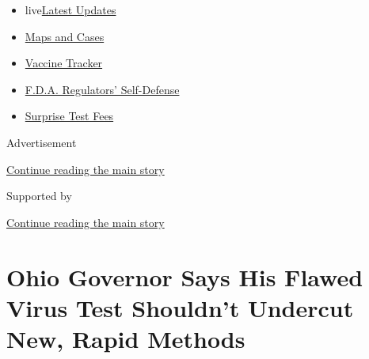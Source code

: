 \begin{itemize}
\tightlist
\item
  live\href{https://www.nytimes3xbfgragh.onion/2020/09/11/world/covid-19-coronavirus.html?name=styln-coronavirus-national\&region=TOP_BANNER\&block=storyline_menu_recirc\&action=click\&pgtype=Article\&impression_id=ec19cb01-f4b6-11ea-8c84-813730b6829b\&variant=undefined}{Latest
  Updates}
\item
  \href{https://www.nytimes3xbfgragh.onion/interactive/2020/us/coronavirus-us-cases.html?name=styln-coronavirus-national\&region=TOP_BANNER\&block=storyline_menu_recirc\&action=click\&pgtype=Article\&impression_id=ec19cb02-f4b6-11ea-8c84-813730b6829b\&variant=undefined}{Maps
  and Cases}
\item
  \href{https://www.nytimes3xbfgragh.onion/interactive/2020/science/coronavirus-vaccine-tracker.html?name=styln-coronavirus-national\&region=TOP_BANNER\&block=storyline_menu_recirc\&action=click\&pgtype=Article\&impression_id=ec19cb03-f4b6-11ea-8c84-813730b6829b\&variant=undefined}{Vaccine
  Tracker}
\item
  \href{https://www.nytimes3xbfgragh.onion/2020/09/10/us/politics/fda-coronavirus-vaccine.html?name=styln-coronavirus-national\&region=TOP_BANNER\&block=storyline_menu_recirc\&action=click\&pgtype=Article\&impression_id=ec19cb04-f4b6-11ea-8c84-813730b6829b\&variant=undefined}{F.D.A.
  Regulators' Self-Defense}
\item
  \href{https://www.nytimes3xbfgragh.onion/2020/09/09/upshot/coronavirus-surprise-test-fees.html?name=styln-coronavirus-national\&region=TOP_BANNER\&block=storyline_menu_recirc\&action=click\&pgtype=Article\&impression_id=ec19cb05-f4b6-11ea-8c84-813730b6829b\&variant=undefined}{Surprise
  Test Fees}
\end{itemize}

Advertisement

\protect\hyperlink{after-top}{Continue reading the main story}

Supported by

\protect\hyperlink{after-sponsor}{Continue reading the main story}

\hypertarget{ohio-governor-says-his-flawed-virus-test-shouldnt-undercut-new-rapid-methods}{%
\section{Ohio Governor Says His Flawed Virus Test Shouldn't Undercut
New, Rapid
Methods}\label{ohio-governor-says-his-flawed-virus-test-shouldnt-undercut-new-rapid-methods}}

